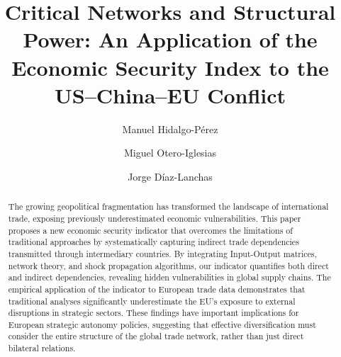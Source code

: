 \documentclass[final,1p,times,authoryear]{elsarticle}
\begin{document}
\begin{frontmatter}
\title{Critical Networks and Structural Power: An Application of the Economic Security Index to the US–China–EU Conflict}
\setlength{\parskip}{3pt plus 1pt minus 1pt}

\renewcommand{\cite}[1]{\textsuperscript{[citation]}}
\renewcommand{\cite}[1]{\textsuperscript{[citation]}}
\renewcommand{\citet}[1]{\textsuperscript{[citation]}}
\renewcommand{\citep}[1]{\textsuperscript{[citation]}}
\renewcommand{\citeyear}[1]{\textsuperscript{[year]}}
\renewcommand{\citeauthor}[1]{\textup{Author}}

\author[upo,elcano]{Manuel Hidalgo-Pérez}
\author[elcano]{Miguel Otero-Iglesias}
\author[comillas]{Jorge Díaz-Lanchas} %






\begin{abstract}
The growing geopolitical fragmentation has transformed the landscape of international trade, exposing previously underestimated economic vulnerabilities. This paper proposes a new economic security indicator that overcomes the limitations of traditional approaches by systematically capturing indirect trade dependencies transmitted through intermediary countries. By integrating Input-Output matrices, network theory, and shock propagation algorithms, our indicator quantifies both direct and indirect dependencies, revealing hidden vulnerabilities in global supply chains. The empirical application of the indicator to European trade data demonstrates that traditional analyses significantly underestimate the EU's exposure to external disruptions in strategic sectors. These findings have important implications for European strategic autonomy policies, suggesting that effective diversification must consider the entire structure of the global trade network, rather than just direct bilateral relations.


\end{abstract}
\end{frontmatter}
\end{document}
